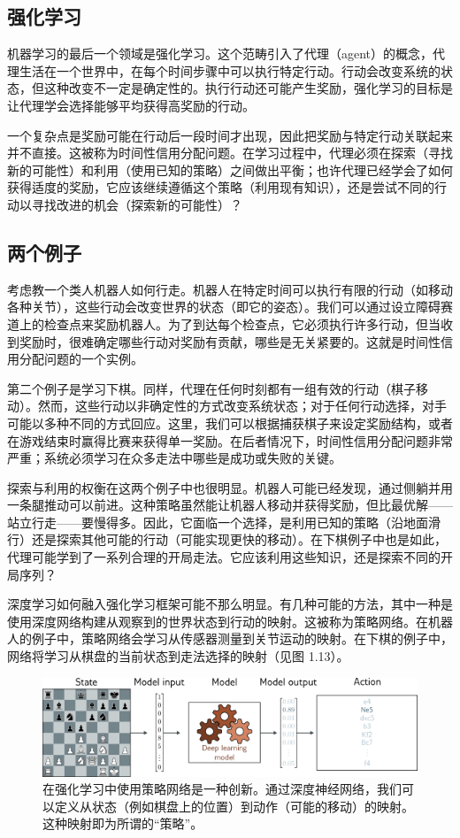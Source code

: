 \subsection{强化学习}
机器学习的最后一个领域是强化学习。这个范畴引入了代理（agent）的概念，代理生活在一个世界中，在每个时间步骤中可以执行特定行动。行动会改变系统的状态，但这种改变不一定是确定性的。执行行动还可能产生奖励，强化学习的目标是让代理学会选择能够平均获得高奖励的行动。

一个复杂点是奖励可能在行动后一段时间才出现，因此把奖励与特定行动关联起来并不直接。这被称为时间性信用分配问题。在学习过程中，代理必须在探索（寻找新的可能性）和利用（使用已知的策略）之间做出平衡；也许代理已经学会了如何获得适度的奖励，它应该继续遵循这个策略（利用现有知识），还是尝试不同的行动以寻找改进的机会（探索新的可能性）？
\subsection{两个例子}
考虑教一个类人机器人如何行走。机器人在特定时间可以执行有限的行动（如移动各种关节），这些行动会改变世界的状态（即它的姿态）。我们可以通过设立障碍赛道上的检查点来奖励机器人。为了到达每个检查点，它必须执行许多行动，但当收到奖励时，很难确定哪些行动对奖励有贡献，哪些是无关紧要的。这就是时间性信用分配问题的一个实例。

第二个例子是学习下棋。同样，代理在任何时刻都有一组有效的行动（棋子移动）。然而，这些行动以非确定性的方式改变系统状态；对于任何行动选择，对手可能以多种不同的方式回应。这里，我们可以根据捕获棋子来设定奖励结构，或者在游戏结束时赢得比赛来获得单一奖励。在后者情况下，时间性信用分配问题非常严重；系统必须学习在众多走法中哪些是成功或失败的关键。

探索与利用的权衡在这两个例子中也很明显。机器人可能已经发现，通过侧躺并用一条腿推动可以前进。这种策略虽然能让机器人移动并获得奖励，但比最优解——站立行走——要慢得多。因此，它面临一个选择，是利用已知的策略（沿地面滑行）还是探索其他可能的行动（可能实现更快的移动）。在下棋例子中也是如此，代理可能学到了一系列合理的开局走法。它应该利用这些知识，还是探索不同的开局序列？

深度学习如何融入强化学习框架可能不那么明显。有几种可能的方法，其中一种是使用深度网络构建从观察到的世界状态到行动的映射。这被称为策略网络。在机器人的例子中，策略网络会学习从传感器测量到关节运动的映射。在下棋的例子中，网络将学习从棋盘的当前状态到走法选择的映射（见图 1.13）。

\begin{figure}
	\centering
	\includegraphics[width=0.7\linewidth]{png/chapter1/IntroReinforce}
	\caption{在强化学习中使用策略网络是一种创新。通过深度神经网络，我们可以定义从状态（例如棋盘上的位置）到动作（可能的移动）的映射。这种映射即为所谓的“策略”。}
\end{figure}


